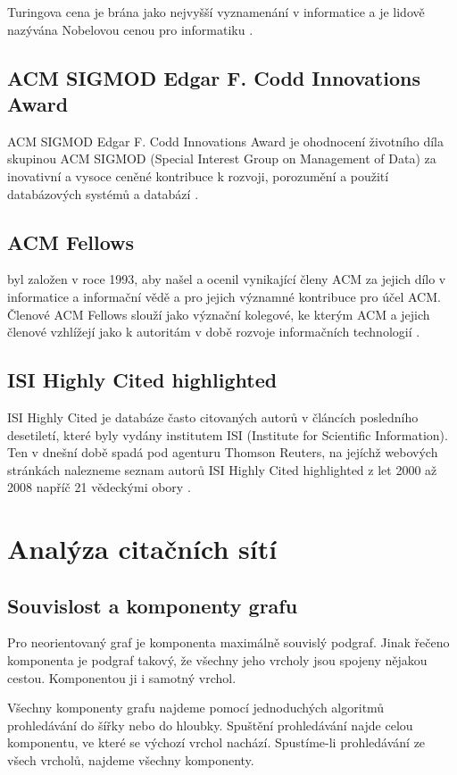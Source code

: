 \documentclass[12pt,titlepage]{report}
\begin{document}
Turingova cena je brána jako nejvyšší vyznamenání v informatice a je lidově
nazývána Nobelovou cenou pro informatiku \cite[p.~317]{dasgupta}.

\subsection{ACM SIGMOD Edgar F. Codd Innovations Award}
ACM SIGMOD Edgar F. Codd Innovations Award je ohodnocení životního díla
skupinou ACM SIGMOD (Special Interest Group on Management of Data)  za
inovativní a vysoce ceněné kontribuce k rozvoji, porozumění a použití
databázových systémů a databází \cite{sigmodinnovations}.

\subsection{ACM Fellows}
 byl založen v roce 1993, aby našel a ocenil
vynikající členy ACM za jejich dílo v informatice a informační vědě a pro
jejich významné kontribuce pro účel ACM. Členové ACM Fellows slouží jako
význační kolegové, ke kterým ACM a jejich členové vzhlížejí jako k autoritám v
době rozvoje informačních technologií \cite{acmfellows}.

\subsection{ISI Highly Cited highlighted}
ISI Highly Cited je databáze často citovaných autorů v článcích posledního
desetiletí, které byly vydány institutem ISI (Institute for Scientific
Information). Ten v dnešní době spadá pod agenturu Thomson Reuters, na jejíchž
webových stránkách nalezneme seznam autorů ISI Highly Cited highlighted z let
2000 až 2008 napříč 21 vědeckými obory \cite{highlycited}.

\section{Analýza citačních sítí}
\subsection{Souvislost a komponenty grafu}
Pro neorientovaný graf je komponenta maximálně souvislý podgraf. Jinak řečeno
komponenta je podgraf takový, že všechny jeho vrcholy jsou spojeny nějakou
cestou. Komponentou ji i samotný vrchol.

Všechny komponenty grafu najdeme pomocí jednoduchých algoritmů prohledávání do
šířky nebo do hloubky. Spuštění prohledávání najde celou komponentu, ve které
se výchozí vrchol nachází. Spustíme-li prohledávání ze všech vrcholů, najdeme
všechny komponenty. 
\end{document}
